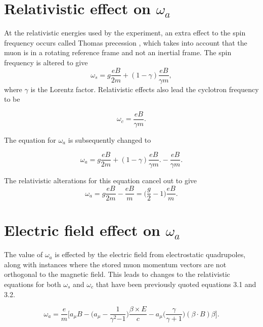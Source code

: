 \section{Relativistic effect on $\omega_{a}$}

At the relativistic energies used by the experiment, an extra effect to the spin frequency occurs called Thomas precession \cite{Chap2Ref2}, which takes into account that the muon is in a rotating reference frame and not an inertial frame. The spin frequency is altered to give
\begin{equation}
\omega_{s} = g\frac{eB}{2m}+(1-\gamma)\frac{eB}{\gamma{m}},
\end{equation}
where $\gamma$ is the Lorentz factor.
Relativistic effects also lead the cyclotron frequency to be 

\begin{equation}
\omega_{c} = \frac{eB}{\gamma{m}}.
\end{equation}

The equation for $\omega_{a}$ is subsequently changed to

\begin{equation}
\omega_{a} = g\frac{eB}{2m}+(1-\gamma)\frac{eB}{\gamma{m}}. -\frac{eB}{\gamma{m}}.
\end{equation}

The relativistic alterations for this equation cancel out to give 
\begin{equation}
\omega_{a} = g\frac{eB}{2m}-\frac{eB}{m} = \bigg(\frac{g}{2}-1\bigg)\frac{eB}{m}.
\end{equation}

\section{Electric field effect on $\omega_{a}$}

The value of $\omega_{a}$ is effected by the electric field from electrostatic quadrupoles, along with instances where the stored muon momentum vectors are not orthogonal to the magnetic field. This leads to changes to the relativistic equations for both $\omega_{s}$ and $\omega_{c}$ that have been previously quoted equations 3.1 and 3.2.

\begin{equation}
\omega_{a} = \frac{e}{m}\bigg[ a_{\mu}B - \bigg(a_{\mu} - \frac{1}{\gamma^2{-1}} \bigg)\frac{\beta{\times}E}{c}-a_{\mu}\bigg(\frac{\gamma}{\gamma+1}\bigg)(\beta\cdot{B})\beta\bigg].
\end{equation}

